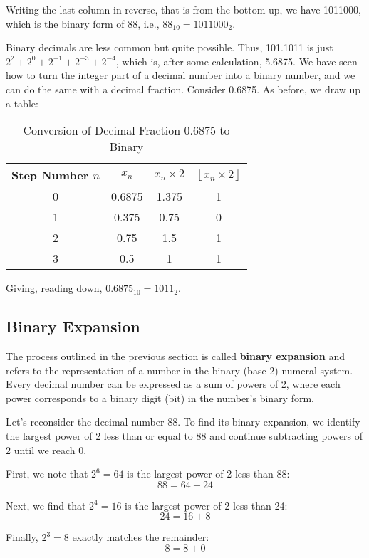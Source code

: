 Writing the last column in reverse, that is from the bottom up, we have 1011000, which is the binary form of 88, i.e., $88_{10} = 1011000_2$.

Binary decimals are less common but quite possible. Thus, 101.1011 is just $2^2 + 2^0 + 2^{-1} + 2^{-3} + 2^{-4}$, which is, after some calculation, 5.6875. We have seen how to turn the integer part of a decimal number into a binary number, and we can do the same with a decimal fraction. Consider 0.6875. As before, we draw up a table:

\begin{table}[h!]
\centering
\renewcommand{\arraystretch}{1.4}
\begin{tabular}{|c|c|c|c|}
\hline 
Step Number $n$ & $x_n$ & $x_n \times 2$ & $\left\lfloor x_n \times 2 \right\rfloor$ \\ \hline
0 & 0.6875 & 1.375 & 1 \\ \hline
1 & 0.375 & 0.75 & 0 \\ \hline
2 & 0.75 & 1.5 & 1 \\ \hline
3 & 0.5 & 1 & 1 \\ \hline
\end{tabular}
\caption{Conversion of Decimal Fraction 0.6875 to Binary}
\end{table}

Giving, reading down, $0.6875_{10} = 1011_2$.

\subsection*{Binary Expansion}

The process outlined in the previous section is called \textbf{binary expansion} and refers to the representation of a number in the binary (base-2) numeral system. Every decimal number can be expressed as a sum of powers of 2, where each power corresponds to a binary digit (bit) in the number's binary form.

Let's reconsider the decimal number 88. To find its binary expansion, we identify the largest power of 2 less than or equal to 88 and continue subtracting powers of 2 until we reach 0.

First, we note that $2^6 = 64$ is the largest power of 2 less than 88:
\[
88 = 64 + 24
\]

Next, we find that $2^4 = 16$ is the largest power of 2 less than 24:
\[
24 = 16 + 8
\]

Finally, $2^3 = 8$ exactly matches the remainder:
\[
8 = 8 + 0
\]

